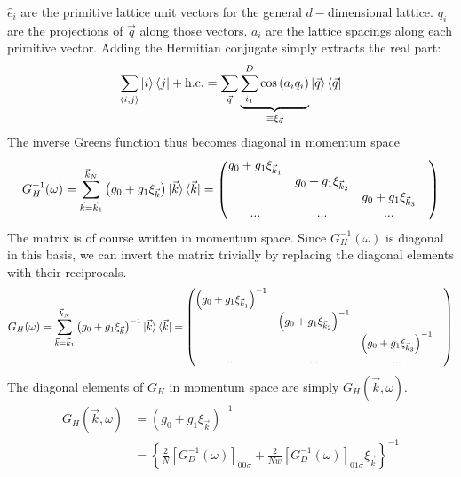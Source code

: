 \documentclass[12pt]{article}
\numberwithin{equation}{section}
\begin{document}
$\hat e_i$ are the primitive lattice unit vectors for the general $d-$dimensional lattice. $q_i$ are the projections of $\vec q$ along those vectors. $a_i$ are the lattice spacings along each primitive vector. Adding the Hermitian conjugate simply extracts the real part:
\begin{equation}\begin{aligned}
	\sum_{\left<i,j \right>} \ket{i}\bra{j} + \text{h.c.} =\sum_{\vec q} \underbrace{\sum_{i_1}^{D}\cos\left(a_iq_i\right)}_{\equiv \xi_{\vec q}}\ket{\vec q}\bra{\vec q}
\end{aligned}\end{equation}
The inverse Greens function thus becomes diagonal in momentum space
\begin{equation}\begin{aligned}
G_H^{-1}(\omega) = \sum_{\vec k=\vec k_1}^{\vec k_N}\left(g_0 + g_1 \xi_{\vec k}\right)\ket{\vec k}\bra{\vec k} = \begin{pmatrix} g_0 + g_1\xi_{\vec k_1} &&& \\
	& g_0 + g_1\xi_{\vec k_2} && \\
	&& g_0 + g_1\xi_{\vec k_3} & \\
	...&...&...&\\
	\end{pmatrix} 
\end{aligned}\end{equation}
The matrix is of course written in momentum space. Since $G_H^{-1}(\omega)$ is diagonal in this basis, we can invert the matrix trivially by replacing the diagonal elements with their reciprocals.
\begin{equation}\begin{aligned}
	G_H(\omega) = \sum_{\vec k=\vec k_1}^{\vec k_N}\left(g_0 + g_1 \xi_{\vec k}\right)^{-1}\ket{\vec k}\bra{\vec k} = \begin{pmatrix} \left(g_0 + g_1\xi_{\vec k_1}\right)^{-1} &&& \\
	& \left(g_0 + g_1\xi_{\vec k_2}\right)^{-1} && \\
	&& \left(g_0 + g_1\xi_{\vec k_3}\right)^{-1} & \\
	...&...&...&\\
	\end{pmatrix} 
\end{aligned}\end{equation}
The diagonal elements of $G_H$ in momentum space are simply $G_H(\vec k, \omega)$.
\begin{equation}\begin{aligned}
	G_H(\vec k, \omega) &= \left(g_0 + g_1 \xi_{\vec k}\right)^{-1}\\
			    &= \left\{\frac{2}{N}\left[G_{D}^{-1}(\omega)\right]_{00\sigma} + \frac{2}{Nw}\left[G_{D}^{-1}(\omega)\right]_{01\sigma}\xi_{\vec k}\right\}^{-1}
\end{aligned}\end{equation}
\end{document}
